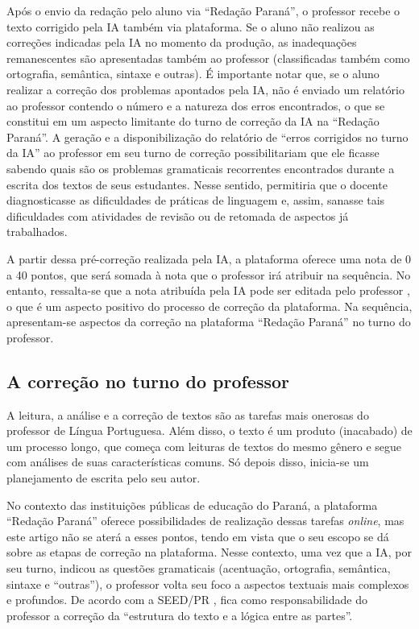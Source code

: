\documentclass[portuguese]{textolivre}
\begin{document}
Após o envio da redação pelo aluno via ``Redação Paraná'', o professor recebe o texto corrigido pela IA também via plataforma. Se o aluno não realizou as correções indicadas pela IA no momento da produção, as inadequações remanescentes são apresentadas também ao professor (classificadas também como ortografia, semântica, sintaxe e outras). É importante notar que, se o aluno realizar a correção dos problemas apontados pela IA, não é enviado um relatório ao professor contendo o número e a natureza dos erros encontrados, o que se constitui em um aspecto limitante do turno de correção da IA na ``Redação Paraná''. A geração e a disponibilização do relatório de ``erros corrigidos no turno da IA'' ao professor em seu turno de correção possibilitariam que ele ficasse sabendo quais são os problemas gramaticais recorrentes encontrados durante a escrita dos textos de seus estudantes. Nesse sentido, permitiria que o docente diagnosticasse as dificuldades de práticas de linguagem e, assim, sanasse tais dificuldades com atividades de revisão ou de retomada de aspectos já trabalhados.

A partir dessa pré-correção realizada pela IA, a plataforma oferece uma nota de 0 a 40 pontos, que será somada à nota que o professor irá atribuir na sequência. No entanto, ressalta-se que a nota atribuída pela IA pode ser editada pelo professor \cite{parana2025a, parana2021b, parana2025b}, o que é um aspecto positivo do processo de correção da plataforma. Na sequência, apresentam-se aspectos da correção na plataforma ``Redação Paraná'' no turno do professor.

\subsection{A correção no turno do professor}
A leitura, a análise e a correção de textos são as tarefas mais onerosas do professor de Língua Portuguesa. Além disso, o texto é um produto (inacabado) de um processo longo, que começa com leituras de textos do mesmo gênero e segue com análises de suas características comuns. Só depois disso, inicia-se um planejamento de escrita pelo seu autor.

No contexto das instituições públicas de educação do Paraná, a plataforma ``Redação Paraná'' oferece possibilidades de realização dessas tarefas \textit{online}, mas este artigo não se aterá a esses pontos, tendo em vista que o seu escopo se dá sobre as etapas de correção na plataforma. Nesse contexto, uma vez que a IA, por seu turno, indicou as questões gramaticais (acentuação, ortografia, semântica, sintaxe e ``outras''), o professor volta seu foco a aspectos textuais mais complexos e profundos. De acordo com a SEED/PR \cite{parana2023}, fica como responsabilidade do professor a correção da ``estrutura do texto e a lógica entre as partes''.
\end{document}
